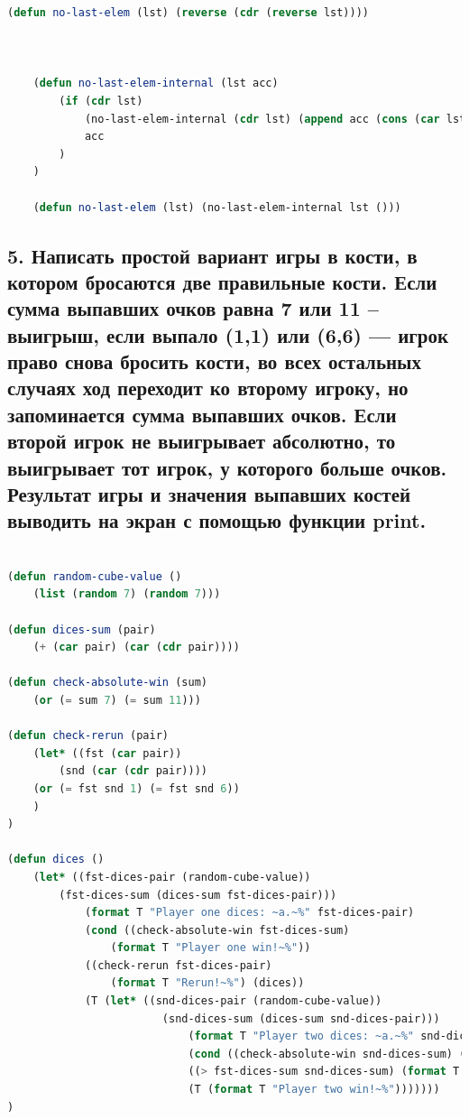 \documentclass[12pt]{report}
\begin{document}
\begin{lstlisting}[label=6xd, caption=Решение задания №4, language=lisp]
	(defun no-last-elem (lst) (reverse (cdr (reverse lst))))



	(defun no-last-elem-internal (lst acc)
		(if (cdr lst)
			(no-last-elem-internal (cdr lst) (append acc (cons (car lst) Nil)))
			acc
		)
	)
	
	(defun no-last-elem (lst) (no-last-elem-internal lst ()))
\end{lstlisting}

\subsection*{5. Написать простой вариант игры в кости, в котором бросаются две правильные кости. Если
	сумма выпавших очков равна 7 или 11 -- выигрыш, если выпало (1,1) или (6,6) --- игрок право
	снова бросить кости, во всех остальных случаях ход переходит ко второму игроку, но
	запоминается сумма выпавших очков. Если второй игрок не выигрывает абсолютно, то
	выигрывает тот игрок, у которого больше очков. Результат игры и значения выпавших костей
	выводить на экран с помощью функции print.}

\begin{lstlisting}[label=6xd, caption=Решение задания №5, language=lisp]

(defun random-cube-value ()
	(list (random 7) (random 7)))

(defun dices-sum (pair)
	(+ (car pair) (car (cdr pair))))

(defun check-absolute-win (sum)
	(or (= sum 7) (= sum 11)))

(defun check-rerun (pair)
	(let* ((fst (car pair))
		(snd (car (cdr pair))))
	(or (= fst snd 1) (= fst snd 6))
	)
)

(defun dices ()
	(let* ((fst-dices-pair (random-cube-value))
		(fst-dices-sum (dices-sum fst-dices-pair)))
			(format T "Player one dices: ~a.~%" fst-dices-pair)
			(cond ((check-absolute-win fst-dices-sum)
				(format T "Player one win!~%"))
			((check-rerun fst-dices-pair)
				(format T "Rerun!~%") (dices))
			(T (let* ((snd-dices-pair (random-cube-value))
						(snd-dices-sum (dices-sum snd-dices-pair)))
							(format T "Player two dices: ~a.~%" snd-dices-pair)
							(cond ((check-absolute-win snd-dices-sum) (format T "Player two win!~%"))
							((> fst-dices-sum snd-dices-sum) (format T "Player one win!~%"))
							(T (format T "Player two win!~%")))))))
)

\end{lstlisting}
\end{document}
